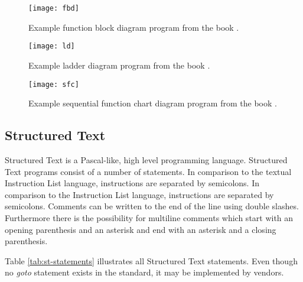 \begin{figure}[h!]
	\centering
	\texttt{[image: fbd]}
	\caption{Example function block diagram program from the book \cite{johnIEC611313Programming2010}.}
	\label{code:fbd}
\end{figure}

\begin{figure}[h!]
	\centering
	\texttt{[image: ld]}
	\caption{Example ladder diagram program from the book \cite{johnIEC611313Programming2010}.}
	\label{code:ld}
\end{figure}

\begin{figure}[h!]
	\centering
	\texttt{[image: sfc]}
	\caption{Example sequential function chart diagram program from the book \cite{johnIEC611313Programming2010}.}
	\label{code:sfc}
\end{figure}


\subsection{Structured Text}
\label{sub:structured text}
Structured Text is a Pascal-like, high level programming language.
Structured Text programs consist of a number of statements. In comparison to the textual Instruction List language, instructions are separated by semicolons. 
In comparison to the Instruction List language, instructions are separated by semicolons. Comments can be written to the end of the line using double slashes. Furthermore there is the possibility for multiline comments which start with an opening parenthesis and an asterisk and end with an asterisk and a closing parenthesis.

Table \ref{tab:st-statements} illustrates all Structured Text statements. Even though no \emph{goto} statement exists in the standard, it may be implemented by vendors. 


